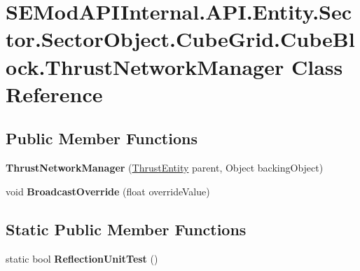 \hypertarget{class_s_e_mod_a_p_i_internal_1_1_a_p_i_1_1_entity_1_1_sector_1_1_sector_object_1_1_cube_grid_1_1160ab026af0740b86534e6935a74fff2}{}\section{S\+E\+Mod\+A\+P\+I\+Internal.\+A\+P\+I.\+Entity.\+Sector.\+Sector\+Object.\+Cube\+Grid.\+Cube\+Block.\+Thrust\+Network\+Manager Class Reference}
\label{class_s_e_mod_a_p_i_internal_1_1_a_p_i_1_1_entity_1_1_sector_1_1_sector_object_1_1_cube_grid_1_1160ab026af0740b86534e6935a74fff2}
\subsection*{Public Member Functions}
\begin{DoxyCompactItemize}
\item 
\hypertarget{class_s_e_mod_a_p_i_internal_1_1_a_p_i_1_1_entity_1_1_sector_1_1_sector_object_1_1_cube_grid_1_1160ab026af0740b86534e6935a74fff2_ae0f4eea3de94a719d5297244dff54cd3}{}{\bfseries Thrust\+Network\+Manager} (\hyperlink{class_s_e_mod_a_p_i_internal_1_1_a_p_i_1_1_entity_1_1_sector_1_1_sector_object_1_1_cube_grid_1_1_cube_block_1_1_thrust_entity}{Thrust\+Entity} parent, Object backing\+Object)\label{class_s_e_mod_a_p_i_internal_1_1_a_p_i_1_1_entity_1_1_sector_1_1_sector_object_1_1_cube_grid_1_1160ab026af0740b86534e6935a74fff2_ae0f4eea3de94a719d5297244dff54cd3}

\item 
\hypertarget{class_s_e_mod_a_p_i_internal_1_1_a_p_i_1_1_entity_1_1_sector_1_1_sector_object_1_1_cube_grid_1_1160ab026af0740b86534e6935a74fff2_a7aadc48bae1a462ae668aa2eb155fb31}{}void {\bfseries Broadcast\+Override} (float override\+Value)\label{class_s_e_mod_a_p_i_internal_1_1_a_p_i_1_1_entity_1_1_sector_1_1_sector_object_1_1_cube_grid_1_1160ab026af0740b86534e6935a74fff2_a7aadc48bae1a462ae668aa2eb155fb31}

\end{DoxyCompactItemize}
\subsection*{Static Public Member Functions}
\begin{DoxyCompactItemize}
\item 
\hypertarget{class_s_e_mod_a_p_i_internal_1_1_a_p_i_1_1_entity_1_1_sector_1_1_sector_object_1_1_cube_grid_1_1160ab026af0740b86534e6935a74fff2_a4f8805ac6f47db30ff49ce73ef74d780}{}static bool {\bfseries Reflection\+Unit\+Test} ()\label{class_s_e_mod_a_p_i_internal_1_1_a_p_i_1_1_entity_1_1_sector_1_1_sector_object_1_1_cube_grid_1_1160ab026af0740b86534e6935a74fff2_a4f8805ac6f47db30ff49ce73ef74d780}

\end{DoxyCompactItemize}
